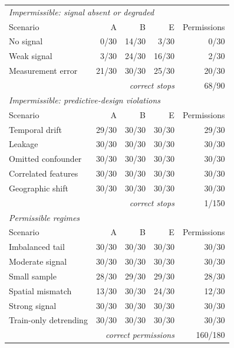 \begin{tabular}{@{}lrrrr@{}}
\toprule
\multicolumn{5}{l}{\textit{Impermissible: signal absent or degraded}} \\
Scenario & A & B & E & Permissions \\
\midrule
No signal & 0/30 & 14/30 & 3/30 & 0/30 \\
Weak signal & 3/30 & 24/30 & 16/30 & 2/30 \\
Measurement error & 21/30 & 30/30 & 25/30 & 20/30 \\
\multicolumn{4}{r}{\textit{correct stops}} & 68/90 \\
\midrule
\multicolumn{5}{l}{\textit{Impermissible: predictive-design violations}} \\
Scenario & A & B & E & Permissions \\
\midrule
Temporal drift & 29/30 & 30/30 & 30/30 & 29/30 \\
Leakage & 30/30 & 30/30 & 30/30 & 30/30 \\
Omitted confounder & 30/30 & 30/30 & 30/30 & 30/30 \\
Correlated features & 30/30 & 30/30 & 30/30 & 30/30 \\
Geographic shift & 30/30 & 30/30 & 30/30 & 30/30 \\
\multicolumn{4}{r}{\textit{correct stops}} & 1/150 \\
\midrule
\multicolumn{5}{l}{\textit{Permissible regimes}} \\
Scenario & A & B & E & Permissions \\
\midrule
Imbalanced tail & 30/30 & 30/30 & 30/30 & 30/30 \\
Moderate signal & 30/30 & 30/30 & 30/30 & 30/30 \\
Small sample & 28/30 & 29/30 & 29/30 & 28/30 \\
Spatial mismatch & 13/30 & 30/30 & 24/30 & 12/30 \\
Strong signal & 30/30 & 30/30 & 30/30 & 30/30 \\
Train-only detrending & 30/30 & 30/30 & 30/30 & 30/30 \\
\multicolumn{4}{r}{\textit{correct permissions}} & 160/180 \\
\bottomrule
\end{tabular}
